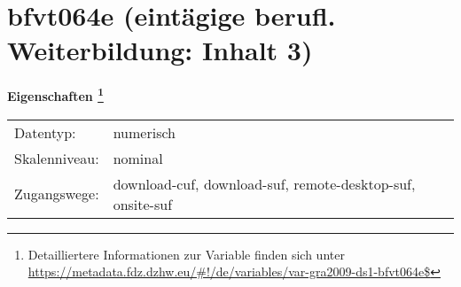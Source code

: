 
    \setcounter{footnote}{0}

    \vspace*{-1.8cm}
	\section{bfvt064e (eintägige berufl. Weiterbildung: Inhalt 3)}
	\label{section:bfvt064e}



    \vspace*{0.5cm}
    \noindent\textbf{Eigenschaften
	\footnote{Detailliertere Informationen zur Variable finden sich unter
		\url{https://metadata.fdz.dzhw.eu/\#!/de/variables/var-gra2009-ds1-bfvt064e$}}}\\
	\begin{tabularx}{\hsize}{@{}lX}
	Datentyp: & numerisch \\
	Skalenniveau: & nominal \\
	Zugangswege: &
	  download-cuf, 
	  download-suf, 
	  remote-desktop-suf, 
	  onsite-suf
 \\
    \end{tabularx}



